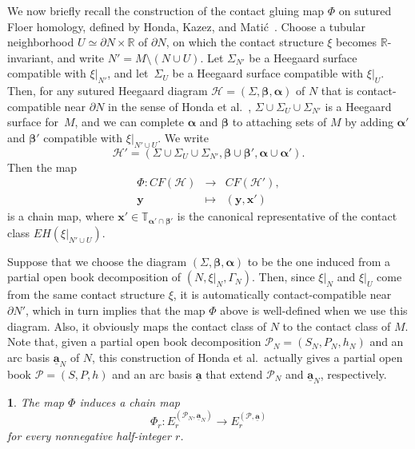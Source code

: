 \documentclass[11pt,oneside,english]{amsart}
\numberwithin{equation}{section}
\numberwithin{figure}{section}
\theoremstyle{definition}
\theoremstyle{plain}
\theoremstyle{plain}
\newtheorem{lem}[thm]{\protect\lemmaname}
\theoremstyle{remark}
\theoremstyle{plain}
\providecommand{\lemmaname}{Lemma}
\begin{document}
We now briefly recall the construction of the contact gluing map $\Phi$ on sutured Floer homology, defined
by Honda, Kazez, and Mati\'c~\cite{key-2}. Choose a tubular neighborhood
$U\simeq\partial N\times\mathbb{R}$ of $\partial N$, on which the
contact structure $\xi$ becomes $\mathbb{R}$-invariant, and write $N' = M \setminus (N \cup U)$.
Let $\Sigma_{N'}$ be a Heegaard surface
compatible with $\xi|_{N'}$, and let~$\Sigma_{U}$ be a Heegaard
surface compatible with $\xi|_{U}$. Then, for any sutured Heegaard
diagram ${\mathcal{H}} = (\Sigma,{\boldsymbol{\beta}},{\boldsymbol{\alpha}})$
of $N$ that is contact-compatible near $\partial N$ in
the sense of Honda et al.~\cite{key-2}, $\Sigma\cup\Sigma_{U}\cup\Sigma_{N'}$
is a Heegaard surface for~$M$, and we can complete ${\boldsymbol{\alpha}}$ and ${\boldsymbol{\beta}}$ to attaching
sets of $M$ by adding ${\boldsymbol{\alpha}}'$ and ${\boldsymbol{\beta}}'$ compatible
with $\xi|_{N' \cup U}$. We write
\[
{\mathcal{H}}' = (\Sigma\cup\Sigma_{U}\cup\Sigma_{N'},{\boldsymbol{\beta}}\cup{\boldsymbol{\beta}}',{\boldsymbol{\alpha}}\cup{\boldsymbol{\alpha}}').
\]
Then the map
\begin{eqnarray*}
\Phi:{\mathit{CF}}({\mathcal{H}}) & \rightarrow & {\mathit{CF}}({\mathcal{H}}'),\\
{\mathbf{y}} & \mapsto & ({\mathbf{y}},{\mathbf{x}}')
\end{eqnarray*}
is a chain map, where ${\mathbf{x}}' \in {\mathbb{T}}_{{\boldsymbol{\alpha}}' \cap {\boldsymbol{\beta}}'}$ is the canonical representative of the contact class $EH(\xi|_{N' \cup U})$.

Suppose that we choose the diagram $(\Sigma,{\boldsymbol{\beta}},{\boldsymbol{\alpha}})$ to be
the one induced from a partial open book decomposition of $(N,\xi|_{N},\Gamma_{N})$.
Then, since $\xi|_{N}$ and $\xi|_{U}$ come from the same contact
structure $\xi$, it is automatically contact-compatible near $\partial N'$,
which in turn implies that the map $\Phi$ above is well-defined when
we use this diagram. Also, it obviously maps the contact class of
$N$ to the contact class of $M$. Note that, given a partial open
book decomposition $\mathcal{P}_{N}=(S_{N},P_{N},h_{N})$ and an arc
basis $\underline{\mathbf{a}}_{N}$ of $N$, this construction of
Honda et al.~actually gives a partial open book $\mathcal{P}=(S,P,h)$ and
an arc basis $\underline{\mathbf{a}}$ that extend $\mathcal{P}_{N}$
and $\underline{\mathbf{a}}_{N}$, respectively.

\begin{lem}
The map $\Phi$ induces a chain map
\[
\Phi_r \colon E_{r}^{(\mathcal{P}_{N},\underline{\mathbf{a}}_{N})}\rightarrow E_{r}^{(\mathcal{P},\underline{\mathbf{a}})}
\]
for every nonnegative half-integer $r$.
\end{lem}
\end{document}
